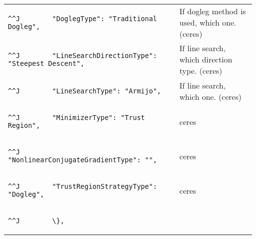 \documentclass[12pt,a4paper,openany,oneside,oldfontcommands]{memoir}
\begin{document}
\begin{tabularx}{\textwidth}{p{8cm} X}
\begin{lstlisting}^^J        "DoglegType": "Traditional Dogleg",\end{lstlisting}    & If dogleg method is used, which one. (ceres)\\
\begin{lstlisting}^^J        "LineSearchDirectionType": "Steepest Descent",\end{lstlisting}    & If line search, which direction type. (ceres)\\
\begin{lstlisting}^^J        "LineSearchType": "Armijo",\end{lstlisting}    & If line search, which one. (ceres)\\
\begin{lstlisting}^^J        "MinimizerType": "Trust Region",\end{lstlisting}    & ceres\\
\begin{lstlisting}^^J        "NonlinearConjugateGradientType": "",\end{lstlisting}    & ceres \\
\begin{lstlisting}^^J        "TrustRegionStrategyType": "Dogleg",\end{lstlisting}    & ceres\\
\begin{lstlisting}^^J        \},\end{lstlisting}    & \\
	\bottomrule
\end{tabularx}
\end{document}
